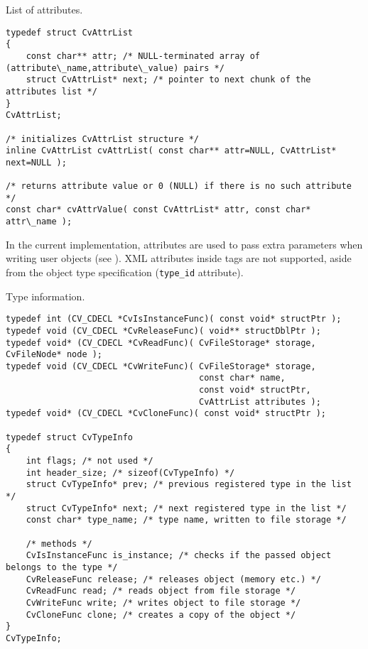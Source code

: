 \label{CvAttrList}
List of attributes.

\begin{lstlisting}
typedef struct CvAttrList
{
    const char** attr; /* NULL-terminated array of (attribute\_name,attribute\_value) pairs */
    struct CvAttrList* next; /* pointer to next chunk of the attributes list */
}
CvAttrList;

/* initializes CvAttrList structure */
inline CvAttrList cvAttrList( const char** attr=NULL, CvAttrList* next=NULL );

/* returns attribute value or 0 (NULL) if there is no such attribute */
const char* cvAttrValue( const CvAttrList* attr, const char* attr\_name );
\end{lstlisting}

In the current implementation, attributes are used to pass extra parameters when writing user objects (see ). XML attributes inside tags are not supported, aside from the object type specification (\texttt{type\_id} attribute).


\label{CvTypeInfo}
Type information.

\begin{lstlisting}
typedef int (CV_CDECL *CvIsInstanceFunc)( const void* structPtr );
typedef void (CV_CDECL *CvReleaseFunc)( void** structDblPtr );
typedef void* (CV_CDECL *CvReadFunc)( CvFileStorage* storage, CvFileNode* node );
typedef void (CV_CDECL *CvWriteFunc)( CvFileStorage* storage,
                                      const char* name,
                                      const void* structPtr,
                                      CvAttrList attributes );
typedef void* (CV_CDECL *CvCloneFunc)( const void* structPtr );

typedef struct CvTypeInfo
{
    int flags; /* not used */
    int header_size; /* sizeof(CvTypeInfo) */
    struct CvTypeInfo* prev; /* previous registered type in the list */
    struct CvTypeInfo* next; /* next registered type in the list */
    const char* type_name; /* type name, written to file storage */

    /* methods */
    CvIsInstanceFunc is_instance; /* checks if the passed object belongs to the type */
    CvReleaseFunc release; /* releases object (memory etc.) */
    CvReadFunc read; /* reads object from file storage */
    CvWriteFunc write; /* writes object to file storage */
    CvCloneFunc clone; /* creates a copy of the object */
}
CvTypeInfo;

\end{lstlisting}

